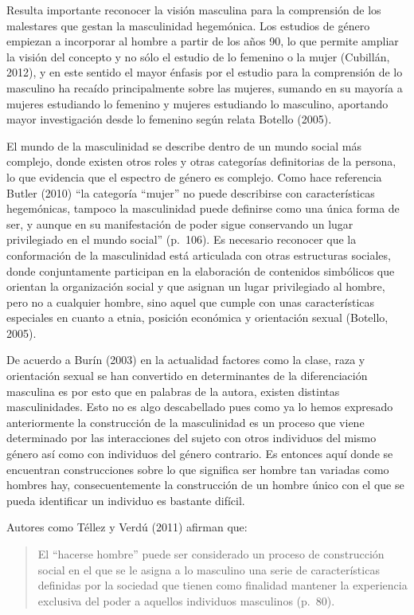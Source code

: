 Resulta importante reconocer la visión masculina para la comprensión de los
malestares que gestan la masculinidad hegemónica.
Los estudios de género empiezan a incorporar al hombre a partir de los años 90,
lo que permite ampliar la visión del concepto y no sólo el estudio de lo
femenino o la mujer (Cubillán, 2012), y en este sentido el mayor énfasis por el
estudio para la comprensión de lo masculino ha recaído principalmente sobre las
mujeres, sumando en su mayoría a mujeres estudiando lo femenino y mujeres
estudiando lo masculino, aportando mayor investigación desde lo femenino según
relata Botello (2005).

El mundo de la masculinidad se describe dentro de un mundo social más complejo,
donde existen otros roles y otras categorías definitorias de la persona, lo que
evidencia que el espectro de género es complejo.
Como hace referencia Butler (2010) “la categoría “mujer” no puede describirse
con características hegemónicas, tampoco la masculinidad puede definirse como
una única forma de ser, y aunque en su manifestación de poder sigue conservando
un lugar privilegiado en el mundo social” (p.~106).
Es necesario reconocer que la conformación de la masculinidad está articulada
con otras estructuras sociales, donde conjuntamente participan en la elaboración
de contenidos simbólicos que orientan la organización social y que asignan un
lugar privilegiado al hombre, pero no a cualquier hombre, sino aquel que cumple
con unas características especiales en cuanto a etnia, posición económica y
orientación sexual (Botello, 2005).

De acuerdo a Burín (2003) en la actualidad factores como la clase, raza y
orientación sexual se han convertido en determinantes de la diferenciación
masculina es por esto que en palabras de la autora, existen distintas
masculinidades.
Esto no es algo descabellado pues como ya lo hemos expresado anteriormente la
construcción de la masculinidad es un proceso que viene determinado por las
interacciones del sujeto con otros individuos del mismo género así como con
individuos del género contrario.
Es entonces aquí donde se encuentran construcciones sobre lo que significa ser
hombre tan variadas como hombres hay, consecuentemente la construcción de un
hombre único con el que se pueda identificar un individuo es bastante difícil.

Autores como Téllez y Verdú (2011) afirman que:

\begin{quote}
    El “hacerse hombre” puede ser considerado un proceso de construcción social en
    el que se le asigna a lo masculino una serie de características definidas por la
    sociedad que tienen como finalidad mantener la experiencia exclusiva del poder a
    aquellos individuos masculinos (p.~80).
\end{quote}


